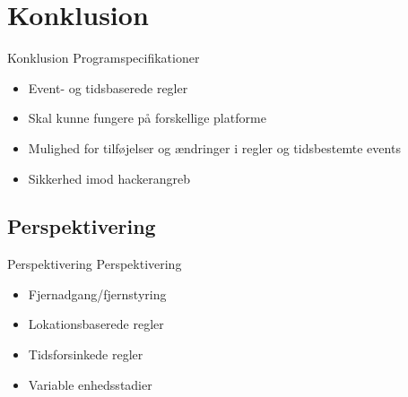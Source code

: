\section{Konklusion}
\begin{frame}{Konklusion}{}
Programspecifikationer
\begin{itemize}
\item Event- og tidsbaserede regler
\item Skal kunne fungere på forskellige platforme
\item Mulighed for tilføjelser og ændringer i regler og tidsbestemte events
\item Sikkerhed imod hackerangreb
\end{itemize}
\end{frame}
\subsection{Perspektivering}
\begin{frame}{Perspektivering}{}
Perspektivering
\begin{itemize}
\item Fjernadgang/fjernstyring
\item Lokationsbaserede regler
\item Tidsforsinkede regler
\item Variable enhedsstadier
\end{itemize}
\end{frame}